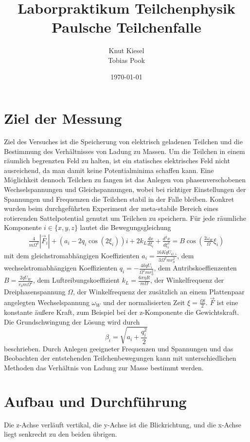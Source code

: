 \documentclass[a4paper,12pt]{article}
\title{Laborpraktikum Teilchenphysik\\ Paulsche Teilchenfalle}
\author{Knut Kiesel\\Tobias Pook}
\date{\today}
\begin{document}
\maketitle
\thispagestyle{empty}
\newpage
\tableofcontents
\setcounter{page}{1}
\newpage

\section{Ziel der Messung} %
Ziel des Versuches ist die Speicherung von elektrisch geladenen Teilchen und die Bestimmung des Verhältnisses von Ladung zu Massen.
Um die Teilchen in einem räumlich begrenzten Feld zu halten, ist ein statisches elektrisches Feld nicht ausreichend, da man damit keine Potentialminima schaffen kann.
Eine Möglichkeit dennoch Teilchen zu fangen ist das Anlegen von phasenverschobenen Wechselspannungen und Gleichspannungen, wobei bei richtiger Einstellungen der Spannungen und Frequenzen die Teilchen stabil in der Falle bleiben.
Konkret wurden beim durchgeführten Experiment der meta-stabile Bereich eines rotierenden Sattelpotential genutzt um Teilchen zu speichern.
Für jede räumliche Komponente $i\in\{x,y,z\}$ lautet die Bewegungsgleichung
\begin{align*}\label{mastergleichung}
	\frac{4}{mΩ^2} |\vec{F}_i| + \left( a_i -2q_i \cos\left( 2\xi_i \right) \right) i  + 2k_L \frac{dx}{d\xi_i} + \frac{d^2x}{d\xi_i^2} = B\cos\left( \frac{2ω_W}{Ω}ξ_i \right)
\end{align*}
mit dem gleichstromabhängigen Koeffizienten $a_i = \frac{16KqU_{G,i}}{3Ω^2mr_0^2}$,
dem wechselstromabhängigen Koeffizienten  $q_i = -\frac{4kqU_i}{Ω^2mr_0^2}$,
dem Antribskoeffienzenten $B = \frac{2qU_W}{r_0mΩ^2}$,
dem Luftreibungskoeffizient $k_L = \frac{6πηR}{mΩ}$, der Winkelfrequenz der Dreiphasenspannung $Ω$,
der Winkelfrequenz der zusätzlich an einem Plattenpaar angelegten Wechselspannung $ω_W$
und der normalisierten Zeit $ξ = \frac{Ωt}{2}$.
$\vec{F}$ ist eine konstante äußere Kraft, zum Beispiel bei der z-Komponente die Gewichtskraft.
Die Grundschwingung der Lösung wird durch
$$β_i = \sqrt{a_i + \frac{q_i^2}{2}}$$
beschrieben.
Durch Anlegen geeigneter Frequenzen und Spannungen und das Beobachten der entstehenden Teilchenbewegungen kann mit unterschiedlichen Methoden das Verhältnis von Ladung zur Masse bestimmt werden.


\section{Aufbau und Durchführung}
Die z-Achse verläuft vertikal, die y-Achse ist die Blickrichtung, und die x-Achse liegt senkrecht zu den beiden übrigen.
\end{document}

